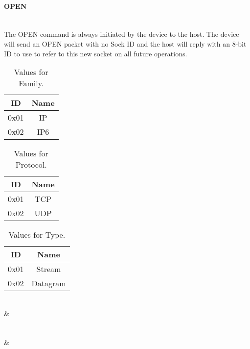\documentclass[10pt]{article}
\begin{document}
	\paragraph{OPEN} \mbox{}\\
	The OPEN command is always initiated by the device to the host. The device will send an OPEN packet with no Sock ID and the host will reply with an 8-bit ID to use to refer to this new socket on all future operations. \\
	\begin{table}[H]
		\begin{center}
			\caption{Values for Family.}
			\label{tab:table2}
			\begin{tabular}{c|c} 
				\rowcolor{lightgray}
				\textbf{ID} &	\textbf{Name}\\
				\hline
				0x01 & IP\\
				0x02 & IP6\\
			\end{tabular}
		\end{center}
	\end{table} 
	\begin{table}[H]
	\begin{center}
		\caption{Values for Protocol.}
		\label{tab:table3}
		\begin{tabular}{c|c} 
			\rowcolor{lightgray}
			\textbf{ID} &	\textbf{Name}\\
			\hline
			0x01 & TCP\\
			0x02 & UDP\\
		\end{tabular}
	\end{center}
	\end{table}
	\begin{table}[H]
	\begin{center}
		\caption{Values for Type.}
		\label{tab:table4}
		\begin{tabular}{c|c} 
			\rowcolor{lightgray}
			\textbf{ID} &	\textbf{Name}\\
			\hline
			0x01 & Stream\\
			0x02 & Datagram\\
		\end{tabular}
	\end{center}
	\end{table}
	\begin{bytefield}[bitwidth=1.7em]{32}
		 \\
			 &
			 \\
			 \\
			 \\
			 &
			 \\
			 \\
	\end{bytefield}\\
\end{document}
